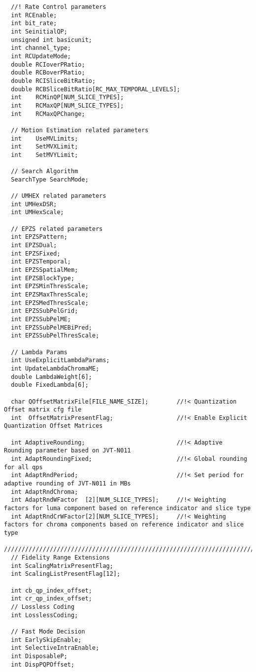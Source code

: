 \begin{lstlisting}
  //! Rate Control parameters
  int RCEnable;
  int bit_rate;
  int SeinitialQP;
  unsigned int basicunit;
  int channel_type;
  int RCUpdateMode;
  double RCIoverPRatio;
  double RCBoverPRatio;
  double RCISliceBitRatio;
  double RCBSliceBitRatio[RC_MAX_TEMPORAL_LEVELS];
  int    RCMinQP[NUM_SLICE_TYPES];
  int    RCMaxQP[NUM_SLICE_TYPES];
  int    RCMaxQPChange;

  // Motion Estimation related parameters
  int    UseMVLimits;
  int    SetMVXLimit;
  int    SetMVYLimit;

  // Search Algorithm
  SearchType SearchMode;
  
  // UMHEX related parameters
  int UMHexDSR;
  int UMHexScale;

  // EPZS related parameters
  int EPZSPattern;
  int EPZSDual;
  int EPZSFixed;
  int EPZSTemporal;
  int EPZSSpatialMem;
  int EPZSBlockType;
  int EPZSMinThresScale;
  int EPZSMaxThresScale;
  int EPZSMedThresScale;
  int EPZSSubPelGrid;
  int EPZSSubPelME;
  int EPZSSubPelMEBiPred;
  int EPZSSubPelThresScale;

  // Lambda Params
  int UseExplicitLambdaParams;
  int UpdateLambdaChromaME;
  double LambdaWeight[6];
  double FixedLambda[6];

  char QOffsetMatrixFile[FILE_NAME_SIZE];        //!< Quantization Offset matrix cfg file
  int  OffsetMatrixPresentFlag;                  //!< Enable Explicit Quantization Offset Matrices

  int AdaptiveRounding;                          //!< Adaptive Rounding parameter based on JVT-N011
  int AdaptRoundingFixed;                        //!< Global rounding for all qps
  int AdaptRndPeriod;                            //!< Set period for adaptive rounding of JVT-N011 in MBs
  int AdaptRndChroma;
  int AdaptRndWFactor  [2][NUM_SLICE_TYPES];     //!< Weighting factors for luma component based on reference indicator and slice type
  int AdaptRndCrWFactor[2][NUM_SLICE_TYPES];     //!< Weighting factors for chroma components based on reference indicator and slice type

//////////////////////////////////////////////////////////////////////////
  // Fidelity Range Extensions
  int ScalingMatrixPresentFlag;
  int ScalingListPresentFlag[12];

  int cb_qp_index_offset;
  int cr_qp_index_offset;
  // Lossless Coding
  int LosslessCoding;

  // Fast Mode Decision
  int EarlySkipEnable;
  int SelectiveIntraEnable;
  int DisposableP;
  int DispPQPOffset;


\end{lstlisting}
